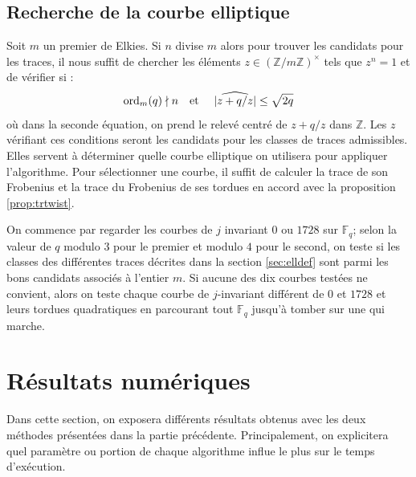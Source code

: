 \documentclass[a4paper]{article} %
\numberwithin{section}{part}
\numberwithin{equation}{section}
\newcommand\zmodninv[1]{(\mathbb{Z}/#1\mathbb{Z})^{\times}}
\newcommand\GF[1]{\mathbb{F}_{#1}}
\newcommand\ZZ{\mathbb{Z}}
\newcommand\etmath{\textup{\quad et \quad}}
\newcommand\ord[2]{\textup{ord}_{#1}(#2)}
\begin{document}
\subsection{Recherche de la courbe elliptique}
Soit $m$ un premier de Elkies. Si $n$ divise $m$ alors pour trouver les
candidats pour les traces, il nous suffit de chercher les éléments 
$z\in\zmodninv{m}$ tels que $z^n = 1$ et de vérifier si :
\begin{equation}
\ord{m}{q} \nmid n \etmath \vert{\widehat{z + q/z}}\vert\leq\sqrt{2q}
\end{equation}
où dans la seconde équation, on prend le relevé centré de $z + q/z$ dans $\ZZ$. 
Les $z$ vérifiant ces conditions seront les candidats pour les classes de traces
admissibles. Elles servent à déterminer quelle courbe elliptique on utilisera
pour appliquer l'algorithme. Pour sélectionner une courbe, il suffit de calculer
la trace de son Frobenius et la trace du Frobenius de ses tordues en accord avec
la proposition \ref{prop:trtwist}.\par
On commence par regarder les courbes de $j$ invariant $0$ ou $1728$ sur 
$\GF{q}$; selon la valeur de $q$ modulo $3$ pour le premier et modulo $4$ pour 
le second, on teste si les classes des différentes traces décrites dans la 
section \ref{sec:elldef} sont parmi les bons candidats associés à l'entier $m$. 
Si aucune des dix courbes testées ne convient, alors on teste chaque courbe de 
$j$-invariant différent de $0$ et $1728$ et leurs tordues quadratiques en 
parcourant tout $\GF{q}$ jusqu'à tomber sur une qui marche.\par

\section{Résultats numériques}
\label{sec:resnum}
%
%
%
%
Dans cette section, on exposera différents résultats obtenus avec les deux
méthodes présentées dans la partie précédente. Principalement, on explicitera
quel paramètre ou portion de chaque algorithme influe le plus sur le temps
d'exécution. 
\end{document}
